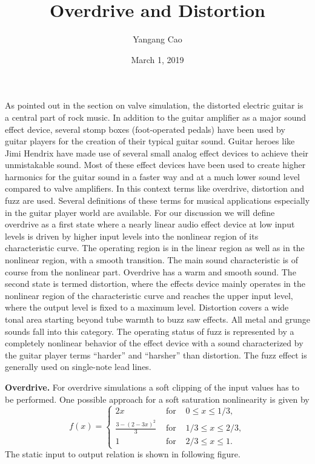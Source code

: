 \documentclass[10pt,a4paper,oneside]{article}
\author{Yangang Cao}
\date{March 1, 2019}
\begin{document}
\title{Overdrive and Distortion}
\maketitle 
As pointed out in the section on valve simulation, the distorted electric guitar is a central part of rock music. In addition to the guitar amplifier as a major sound effect device, several stomp boxes (foot-operated pedals) have been used by guitar players for the creation of their typical guitar sound. Guitar heroes like Jimi Hendrix have made use of several small analog effect devices to achieve their unmistakable sound. Most of these effect devices have been used to create higher harmonics for the guitar sound in a faster way and at a much lower sound level compared to valve amplifiers. In this context terms like overdrive, distortion and fuzz are used. Several definitions of these terms for musical applications especially in the guitar player world are available. For our discussion we will define overdrive as a first state where a nearly linear audio effect device at low input levels is driven by higher input levels into the nonlinear region of its characteristic curve. The operating region is in the linear region as well as in the nonlinear region, with a smooth transition. The main sound characteristic is of course from the nonlinear part. Overdrive has a warm and smooth sound. The second state is termed distortion, where the effects device mainly operates in the nonlinear region of the characteristic curve and reaches the upper input level, where the output level is fixed to a maximum level. Distortion covers a wide tonal area starting beyond tube warmth to buzz saw effects. All metal and grunge sounds fall into this category. The operating status of fuzz is represented by a completely nonlinear behavior of the effect device with a sound characterized by the guitar player terms “harder” and “harsher” than distortion. The fuzz effect is generally used on single-note lead lines.

{\bfseries Overdrive.} For overdrive simulations a soft clipping of the input values has to be performed. One possible approach for a soft saturation nonlinearity is given by
\[
f(x)=\left\{\begin{array}{lll}{2 x} & {\text { for }} & {0 \leq x \leq 1 / 3,} \\ {\frac{3-(2-3 x)^{2}}{3}} & {\text { for }} & {1 / 3 \leq x \leq 2 / 3,} \\ {1} & {\text { for }} & {2 / 3 \leq x \leq 1.}\end{array}\right.
\]
The static input to output relation is shown in following figure.
\end{document}
